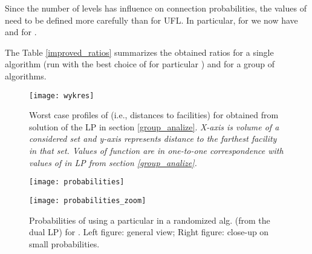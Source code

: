 \documentclass{llncs}
\newcommand{\va}[1]{{\color{black}\sl  #1}}
\begin{document}
Since the number of levels has influence on connection probabilities, the values of  need to be defined more carefully than for UFL.
In particular, for  we now have  and  for .

The Table \ref{improved_ratios} summarizes the obtained ratios for a single algorithm (run with the best choice of  for particular ) and for a group of algorithms.

\begin{figure}
  \centering
  \texttt{[image: wykres]}
  \caption{Worst case profiles of  (i.e., distances to facilities) for  obtained from solution of the LP in section \ref{group_analize}. \va{X-axis is volume of a considered set and y-axis represents distance to the farthest facility in that set. Values of function  are in one-to-one correspondence with values of  in LP from section \ref{group_analize}.}}
  \label{fig:hardcase}
\end{figure}
\begin{figure}
\begin{minipage}{6cm}
  \centering
  \texttt{[image: probabilities]}
\end{minipage}
\begin{minipage}{6cm}
  \centering
  \texttt{[image: probabilities\_zoom]}
\end{minipage}
 \caption{Probabilities of using a particular  in a randomized alg. (from the dual LP) for .
 Left figure: general view; Right figure: close-up on small probabilities.}
  \label{fig:probabilities}
\end{figure}
\end{document}
